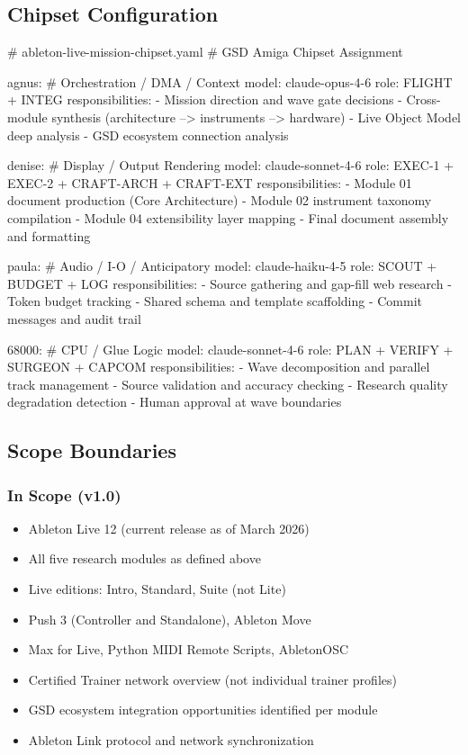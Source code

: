 \documentclass[11pt,letterpaper]{article}
\begin{document}
\subsection{Chipset Configuration}

\begin{asciibox}
# ableton-live-mission-chipset.yaml
# GSD Amiga Chipset Assignment

agnus:                        # Orchestration / DMA / Context
  model: claude-opus-4-6
  role: FLIGHT + INTEG
  responsibilities:
    - Mission direction and wave gate decisions
    - Cross-module synthesis (architecture --> instruments --> hardware)
    - Live Object Model deep analysis
    - GSD ecosystem connection analysis

denise:                       # Display / Output Rendering
  model: claude-sonnet-4-6
  role: EXEC-1 + EXEC-2 + CRAFT-ARCH + CRAFT-EXT
  responsibilities:
    - Module 01 document production (Core Architecture)
    - Module 02 instrument taxonomy compilation
    - Module 04 extensibility layer mapping
    - Final document assembly and formatting

paula:                        # Audio / I-O / Anticipatory
  model: claude-haiku-4-5
  role: SCOUT + BUDGET + LOG
  responsibilities:
    - Source gathering and gap-fill web research
    - Token budget tracking
    - Shared schema and template scaffolding
    - Commit messages and audit trail

68000:                        # CPU / Glue Logic
  model: claude-sonnet-4-6
  role: PLAN + VERIFY + SURGEON + CAPCOM
  responsibilities:
    - Wave decomposition and parallel track management
    - Source validation and accuracy checking
    - Research quality degradation detection
    - Human approval at wave boundaries
\end{asciibox}

\subsection{Scope Boundaries}

\subsubsection{In Scope (v1.0)}
\begin{itemize}[leftmargin=1.5em]
  \item Ableton Live 12 (current release as of March 2026)
  \item All five research modules as defined above
  \item Live editions: Intro, Standard, Suite (not Lite)
  \item Push 3 (Controller and Standalone), Ableton Move
  \item Max for Live, Python MIDI Remote Scripts, AbletonOSC
  \item Certified Trainer network overview (not individual trainer profiles)
  \item GSD ecosystem integration opportunities identified per module
  \item Ableton Link protocol and network synchronization
\end{itemize}
\end{document}

